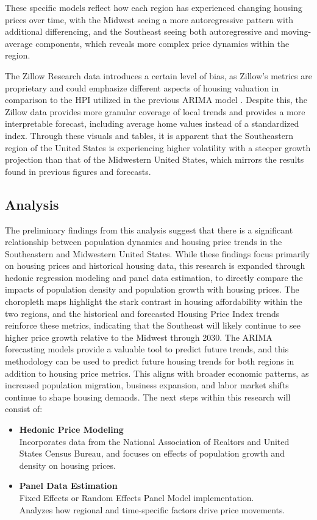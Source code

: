 \documentclass[journal,article,submit,pdftex,moreauthors]{Definitions/mdpi}
\begin{document}
These specific models reflect how each region has experienced changing housing prices over time, with the Midwest seeing a more autoregressive pattern with additional differencing, and the Southeast seeing both autoregressive and moving-average components, which reveals more complex price dynamics within the region.

The Zillow Research data introduces a certain level of bias, as Zillow’s metrics are proprietary and could emphasize different aspects of housing valuation in comparison to the HPI utilized in the previous ARIMA model \citep{zillow_2024_housing}. Despite this, the Zillow data provides more granular coverage of local trends and provides a more interpretable forecast, including average home values instead of a standardized index. Through these visuals and tables, it is apparent that the Southeastern region of the United States is experiencing higher volatility with a steeper growth projection than that of the Midwestern United States, which mirrors the results found in previous figures and forecasts.

\subsection{Analysis}

The preliminary findings from this analysis suggest that there is a significant relationship between population dynamics and housing price trends in the Southeastern and Midwestern United States. While these findings focus primarily on housing prices and historical housing data, this research is expanded through hedonic regression modeling and panel data estimation, to directly compare the impacts of population density and population growth with housing prices. The choropleth maps highlight the stark contrast in housing affordability within the two regions, and the historical and forecasted Housing Price Index trends reinforce these metrics, indicating that the Southeast will likely continue to see higher price growth relative to the Midwest through 2030. The ARIMA forecasting models provide a valuable tool to predict future trends, and this methodology can be used to predict future housing trends for both regions in addition to housing price metrics. This aligns with broader economic patterns, as increased population migration, business expansion, and labor market shifts continue to shape housing demands. The next steps within this research will consist of:

\begin{itemize}
    \item \textbf{Hedonic Price Modeling} \\
    Incorporates data from the National Association of Realtors and United States Census Bureau, and focuses on effects of population growth and density on housing prices.

    \item \textbf{Panel Data Estimation} \\
    Fixed Effects or Random Effects Panel Model implementation. \\
    Analyzes how regional and time-specific factors drive price movements.
\end{itemize}
\end{document}
